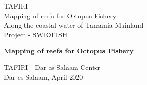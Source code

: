 \begin{titlepage}
\vspace * {-2.5cm}	
	TAFIRI\\
	Mapping of reefs for Octopus Fishery\\
	Along the coastal water of Tanzania Mainland\\
	Project - SWIOFISH
	
\begin{center}

\vspace * {5cm}
\huge \textbf{Mapping of reefs for Octopus Fishery}

%
%


\vspace * {2cm}

\large
TAFIRI - Dar es Salaam Center\\ 

\large
Dar es Salaam, April 2020\\ 


\end{center}


\end{titlepage}


